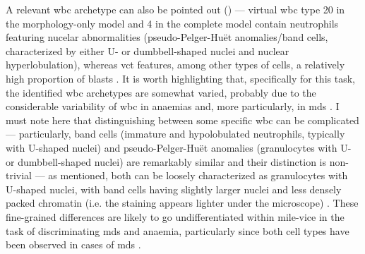 \begin{figure}[!ht]
    \label{fig:rbc-disease-detection-examples}
\end{figure}

A relevant \ac{wbc} archetype can also be pointed out () --- virtual \ac{wbc} type 20 in the morphology-only model and 4 in the complete model contain neutrophils featuring nucelar abnormalities (pseudo-Pelger-Huët anomalies/band cells, characterized by either U- or dumbbell-shaped nuclei \cite{Bain2005-zg} and nuclear hyperlobulation), whereas \ac{vct} features, among other types of cells, a relatively high proportion of blasts . It is worth highlighting that, specifically for this task, the identified \ac{wbc} archetypes are somewhat varied, probably due to the considerable variability of \ac{wbc} in anaemias and, more particularly, in \ac{mds} \cite{Bain2005-zg,Bain2014-oc}. I must note here that distinguishing between some specific \ac{wbc} can be complicated --- particularly, band cells (immature and hypolobulated neutrophils, typically with U-shaped nuclei) and pseudo-Pelger-Huët anomalies (granulocytes with U- or dumbbell-shaped nuclei) are remarkably similar and their distinction is non-trivial --- as mentioned, both can be loosely characterized as granulocytes with U-shaped nuclei, with band cells having slightly larger nuclei and less densely packed chromatin (i.e. the staining appears lighter under the microscope) \cite{Colella2012-so}. These fine-grained differences are likely to go undifferentiated within \ac{mile-vice} in the task of discriminating \ac{mds} and anaemia, particularly since both cell types have been observed in cases of \ac{mds} \cite{Davey1988-zn,Cunningham1995-pc}.

\begin{figure}[!ht]
    \label{fig:wbc-disease-detection-examples}
\end{figure}

